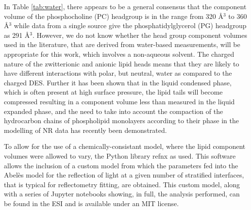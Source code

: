 \documentclass[twoside,twocolumn,9pt]{article}
\begin{document}
In Table \ref{tab:water}, there appears to be a general consensus that the component volume of the phosphocholine (PC) headgroup is in the range from 320 \AA$^3$ to 360 \AA$^3$ while data from a single source give the phosphatidylglycerol (PG) headgroup as 291 \AA$^3$. However, we do not know whether the head group component volumes used in the literature, that are derived from water-based measurements, will be appropriate for this work, which involves a non-aqueous solvent. The charged nature of the zwitterionic and anionic lipid heads means that they are likely to have different interactions with polar, but neutral, water as compared to the charged DES.\cite{Sanchez-Fernandez2018} Further it has been shown that in the liquid condensed phase, which is often present at high surface pressure, the lipid tails will become compressed resulting in a component volume less than measured in the liquid expanded phase,\cite{Marsh2010,Small1984} and the need to take into account the compaction of the hydrocarbon chains of phospholipid monolayers according to their phase in the modelling of NR data has recently been demonstrated.\cite{Campbell2018}

To allow for the use of a chemically-consistant model, where the lipid component volumes were allowed to vary, the Python library refnx\cite{Nelson2018} as used. This software allows the inclusion of a custom model from which the parameters fed into the Abel\`{e}s model for the reflection of light at a given number of stratified interfaces,\cite{Abeles1950,Parratt1954} that is typical for reflectometry fitting, are obtained. This custom model, along with a series of Jupyter notebooks showing, in full, the analysis performed, can be found in the ESI and is available under an MIT license.\cite{mccluskey_2018} 
\end{document}
